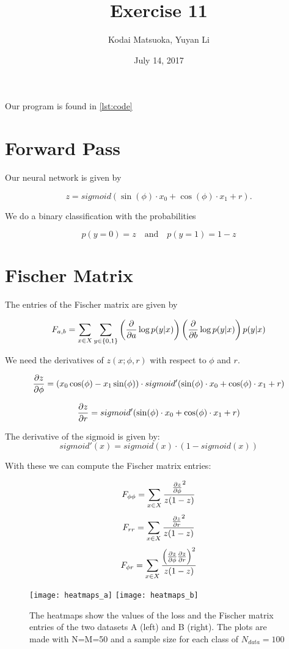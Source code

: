 \documentclass[12pt]{scrartcl}
\author{Kodai Matsuoka, Yuyan Li}
\title{Exercise 11}
\date{July 14, 2017}
\begin{document}
\maketitle

Our program is found in \cref{lst:code}

\section{Forward Pass}

Our neural network is given by

\[
  z = sigmoid(\sin(\phi) \cdot x_0 + \cos(\phi) \cdot x_1 + r).
\]

We do a binary classification with the probabilities

\[ p(y=0)=z \quad \text{and} \quad p(y=1)=1-z \]



\section{Fischer Matrix}

The entries of the Fischer matrix are given by

\[
  F_{a,b} = \sum_{x \in X} \sum_{y \in \{0,1\}} \left( \pdv{}{a} \log p(y|x) \right) \left( \pdv{}{b} \log p(y|x) \right) p(y|x)
\]

We need the derivatives of $z(x;\phi,r)$ with respect to $\phi$ and $r$.

\[
  \pdv{z}{\phi} = \left( x_0 \cos(\phi) - x_1 \sin(\phi) \right) \cdot sigmoid'(\sin(\phi) \cdot x_0 + \cos(\phi) \cdot x_1 + r)
\]

\[
  \pdv{z}{r} = sigmoid'(\sin(\phi) \cdot x_0 + \cos(\phi) \cdot x_1 + r)
\]

The derivative of the sigmoid is given by:
\[
  sigmoid'(x) = sigmoid(x) \cdot (1 - sigmoid(x))
\]

With these we can compute the Fischer matrix entries:

\[
  F_{\phi \phi} = \sum_{x \in X} \frac{\pdv{z}{\phi}^2}{z(1-z)}
\]
\[
  F_{rr} = \sum_{x \in X} \frac{\pdv{z}{r}^2}{z(1-z)}
\]
\[
  F_{\phi r} = \sum_{x \in X} \frac{\left( \pdv{z}{\phi} \pdv{z}{r} \right)^2}{z(1-z)}
\]

\begin{figure}[h]
  \centering
  \texttt{[image: heatmaps\_a]}
  \texttt{[image: heatmaps\_b]}
  \caption{The heatmaps show the values of the loss and the Fischer matrix entries of the two datasets A (left) and B (right). The plots are made with N=M=50 and a sample size for each class of $N_{data}=100$}
  \label{fig:hm}
\end{figure}


\clearpage

\end{document}
